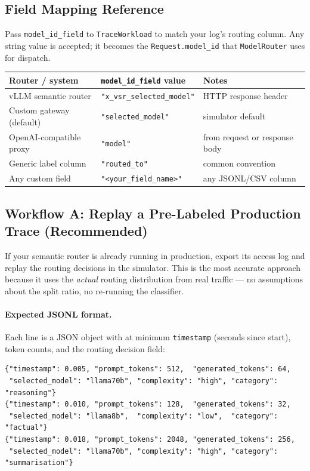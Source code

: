 \documentclass[11pt,a4paper]{article}
\begin{document}
\subsection{Field Mapping Reference}

Pass \texttt{model\_id\_field} to \texttt{TraceWorkload} to match your
log's routing column.  Any string value is accepted; it becomes the
\texttt{Request.model\_id} that \texttt{ModelRouter} uses for dispatch.

\begin{center}
\begin{tabular}{lll}
\toprule
Router / system & \texttt{model\_id\_field} value & Notes \\
\midrule
vLLM semantic router & \texttt{"x\_vsr\_selected\_model"} & HTTP response header \\
Custom gateway (default) & \texttt{"selected\_model"} & simulator default \\
OpenAI-compatible proxy & \texttt{"model"} & from request or response body \\
Generic label column & \texttt{"routed\_to"} & common convention \\
Any custom field & \texttt{"<your\_field\_name>"} & any JSONL/CSV column \\
\bottomrule
\end{tabular}
\end{center}

\subsection{Workflow A: Replay a Pre-Labeled Production Trace (Recommended)}
\label{sec:semantic-replay}

If your semantic router is already running in production, export its access
log and replay the routing decisions in the simulator.  This is the most
accurate approach because it uses the \emph{actual} routing distribution
from real traffic --- no assumptions about the split ratio, no re-running
the classifier.

\paragraph{Expected JSONL format.}
Each line is a JSON object with at minimum \texttt{timestamp}
(seconds since start), token counts, and the routing decision field:

\begin{lstlisting}[style=python]
{"timestamp": 0.005, "prompt_tokens": 512,  "generated_tokens": 64,
 "selected_model": "llama70b", "complexity": "high", "category": "reasoning"}
{"timestamp": 0.010, "prompt_tokens": 128,  "generated_tokens": 32,
 "selected_model": "llama8b",  "complexity": "low",  "category": "factual"}
{"timestamp": 0.018, "prompt_tokens": 2048, "generated_tokens": 256,
 "selected_model": "llama70b", "complexity": "high", "category": "summarisation"}
\end{lstlisting}
\end{document}
